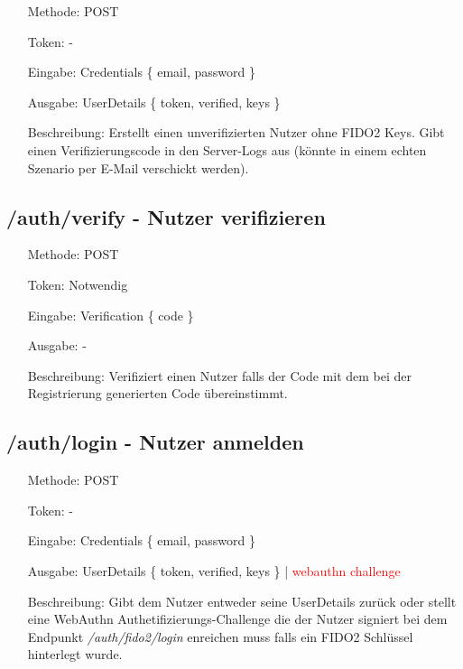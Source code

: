 \documentclass[journal]{IEEEtran}
\begin{document}
\begin{itemize}
	\setlength{\leftskip}{1.5cm}
	\setlength{\itemsep}{0pt}
	\item[Methode:] POST
	\item[Token:] -
	\item[Eingabe:] Credentials \{ email, password \}
	\item[Ausgabe:] UserDetails \{ token, verified, keys \}
	\item[Beschreibung:] Erstellt einen unverifizierten Nutzer ohne FIDO2 Keys.
		Gibt einen Verifizierungscode in den Server-Logs aus (könnte in einem
		echten Szenario per E-Mail verschickt werden).
\end{itemize}

\subsection{/auth/verify - Nutzer verifizieren}

\begin{itemize}
	\setlength{\leftskip}{1.5cm}
	\setlength{\itemsep}{0pt}
	\item[Methode:] POST
	\item[Token:] Notwendig
	\item[Eingabe:] Verification \{ code \}
	\item[Ausgabe:] -
	\item[Beschreibung:] Verifiziert einen Nutzer falls der Code mit dem bei
		der Registrierung generierten Code übereinstimmt.
\end{itemize}


\subsection{/auth/login - Nutzer anmelden}

\begin{itemize}
	\setlength{\leftskip}{1.5cm}
	\setlength{\itemsep}{0pt}
	\item[Methode:] POST
	\item[Token:] -
	\item[Eingabe:] Credentials \{ email, password \}
	\item[Ausgabe:] UserDetails \{ token, verified, keys \} | \textcolor{red}{webauthn challenge}
	\item[Beschreibung:] Gibt dem Nutzer entweder seine UserDetails zurück oder
		stellt eine WebAuthn Authetifizierungs-Challenge die der Nutzer
		signiert bei dem Endpunkt \textit{/auth/fido2/login} enreichen muss
		falls ein FIDO2 Schlüssel hinterlegt wurde.
\end{itemize}
\end{document}
